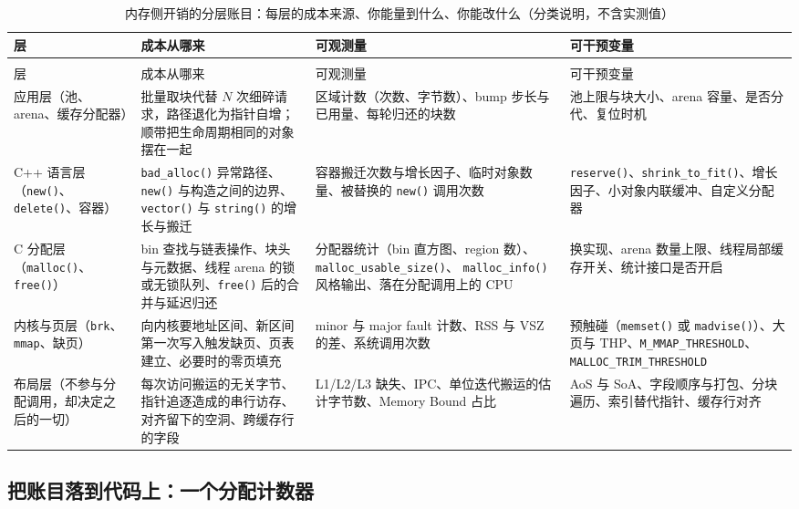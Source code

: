 \documentclass[12pt,a4paper,fontset=fandol]{ctexbook}
\newcommand{\Fn}[1]{\texttt{#1()}}
\newcommand{\Tp}[1]{\texttt{#1}}
\newcommand{\Bk}{\discretionary{}{}{}}
\newcommand{\Lang}[1]{\textsf{#1}}
\newcommand{\CPP}{\Lang{C++}}
\newcommand{\MCpu}{\Lang{CPU}}
\newcommand{\Mx}[1]{\textsf{#1}}
\begin{document}
{\footnotesize
\begin{longtable}{>{\raggedright\arraybackslash}p{}
                  >{\raggedright\arraybackslash}p{}
                  >{\raggedright\arraybackslash}p{}
                  >{\raggedright\arraybackslash}p{}}
\caption{内存侧开销的分层账目：每层的成本来源、你能量到什么、你能改什么（分类说明，不含实测值）}\label{tab:pm07-budget-layers}\\
\hline
层 & 成本从哪来 & 可观测量 & 可干预变量 \\
\hline
\endfirsthead
\multicolumn{4}{l}{（接下页，表 \ref{tab:pm07-budget-layers}）}\\
\hline
层 & 成本从哪来 & 可观测量 & 可干预变量 \\
\hline
\endhead
应用层（池、arena、缓存分配器） &
批量取块代替 $N$ 次细碎请求，路径退化为指针自增；顺带把生命周期相同的对象摆在一起 &
区域计数（次数、字节数）、bump 步长与已用量、每轮归还的块数 &
池上限与块大小、arena 容量、是否分代、复位时机 \\
\hline
\CPP{} 语言层（\Fn{new}、\Fn{delete}、容器） &
\Fn{bad\_alloc} 异常路径、\Fn{new} 与构造之间的边界、\Fn{vector} 与 \Fn{string} 的增长与搬迁 &
容器搬迁次数与增长因子、临时对象数量、被替换的 \Fn{new} 调用次数 &
\Fn{reserve}、\Fn{shrink{\Bk}\_to{\Bk}\_fit}、增长因子、小对象内联缓冲、自定义分配器 \\
\hline
C 分配层（\Fn{malloc}、\Fn{free}） &
bin 查找与链表操作、块头与元数据、线程 arena 的锁或无锁队列、\Fn{free} 后的合并与延迟归还 &
分配器统计（bin 直方图、region 数）、\Fn{malloc{\Bk}\_usable{\Bk}\_size}、
\Fn{malloc{\Bk}\_info} 风格输出、落在分配调用上的 \MCpu{} &
换实现、arena 数量上限、线程局部缓存开关、统计接口是否开启 \\
\hline
内核与页层（\Tp{brk}、\Tp{mmap}、缺页） &
向内核要地址区间、新区间第一次写入触发缺页、页表建立、必要时的零页填充 &
minor 与 major fault 计数、\Mx{RSS} 与 \Mx{VSZ} 的差、系统调用次数 &
预触碰（\Fn{memset} 或 \Fn{madvise}）、大页与 THP、\Tp{M\_MMAP{\Bk}\_THRESHOLD}、
\Tp{MALLOC\_TRIM{\Bk}\_THRESHOLD} \\
\hline
布局层（不参与分配调用，却决定之后的一切） &
每次访问搬运的无关字节、指针追逐造成的串行访存、对齐留下的空洞、跨缓存行的字段 &
\Mx{L1}/\Mx{L2}/\Mx{L3} 缺失、\Mx{IPC}、单位迭代搬运的估计字节数、\Mx{Memory Bound} 占比 &
AoS 与 SoA、字段顺序与打包、分块遍历、索引替代指针、缓存行对齐 \\
\hline
\end{longtable}
}

\subsection{把账目落到代码上：一个分配计数器}
\label{sub:pm07-ledger}
\end{document}
